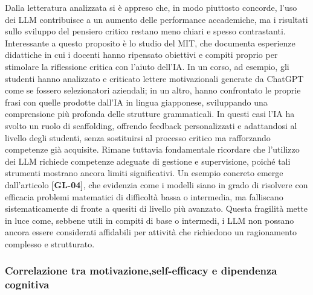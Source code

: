 \documentclass[a4paper,9pt]{article}
\begin{document}
Dalla letteratura analizzata si è appreso che, in modo piuttosto concorde, l’uso dei LLM contribuisce a un aumento delle performance accademiche, ma i risultati sullo sviluppo del pensiero critico restano meno chiari e spesso contrastanti. Interessante a questo proposito è lo studio del MIT, che documenta esperienze didattiche in cui i docenti hanno ripensato obiettivi e compiti proprio per stimolare la riflessione critica con l’aiuto dell’IA. In un corso, ad esempio, gli studenti hanno analizzato e criticato lettere motivazionali generate da ChatGPT come se fossero selezionatori aziendali; in un altro, hanno confrontato le proprie frasi con quelle prodotte dall’IA in lingua giapponese, sviluppando una comprensione più profonda delle strutture grammaticali. In questi casi l’IA ha svolto un ruolo di scaffolding, offrendo feedback personalizzati e adattandosi al livello degli studenti, senza sostituirsi al processo critico ma rafforzando competenze già acquisite. Rimane tuttavia fondamentale ricordare che l’utilizzo dei LLM richiede competenze adeguate di gestione e supervisione, poiché tali strumenti mostrano ancora limiti significativi. Un esempio concreto emerge dall’articolo \textbf{[GL-04]}, che evidenzia come i modelli siano in grado di risolvere con efficacia problemi matematici di difficoltà bassa o intermedia, ma falliscano sistematicamente di fronte a quesiti di livello più avanzato. Questa fragilità mette in luce come, sebbene utili in compiti di base o intermedi, i LLM non possano ancora essere considerati affidabili per attività che richiedono un ragionamento complesso e strutturato.

\subsubsection{Correlazione tra motivazione,self-efficacy e dipendenza cognitiva}
\end{document}

